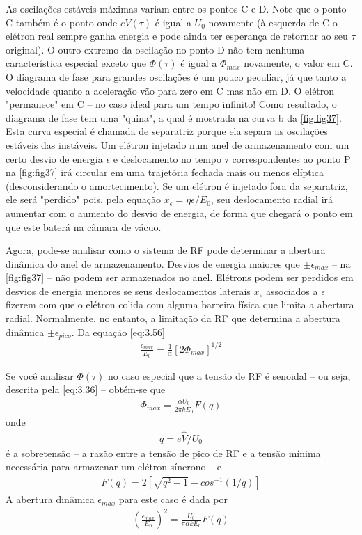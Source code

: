 As oscilações estáveis máximas variam entre os pontos C e D. Note que o ponto C também é o ponto onde $eV(\tau)$ é igual a $U_0$ novamente (à esquerda de C o elétron real sempre ganha energia e pode ainda ter esperança de retornar ao seu $\tau$ original). O outro extremo da oscilação no ponto D não tem nenhuma característica especial exceto que $\Phi(\tau)$ é igual a $\Phi_{max}$ novamente, o valor em C. O diagrama de fase para grandes oscilações é um pouco peculiar, já que tanto a velocidade quanto a aceleração vão para zero em C mas não em D. O elétron "permanece" em C -- no caso ideal para um tempo infinito! Como resultado, o diagrama de fase tem uma "quina", a qual é mostrada na curva b da \autoref{fig:fig37}. Esta curva especial é chamada de \uline{separatriz} porque ela separa as oscilações estáveis das instáveis. Um elétron injetado num anel de armazenamento com um certo desvio de energia $\epsilon$ e deslocamento no tempo $\tau$ correspondentes ao ponto P na \autoref{fig:fig37} irá circular em uma trajetória fechada mais ou menos elíptica (desconsiderando o amortecimento). Se um elétron é injetado fora da separatriz, ele será "perdido" pois, pela equação $x_\epsilon = \eta \epsilon/E_0$, seu deslocamento radial irá aumentar com o aumento do desvio de energia, de forma que chegará o ponto em que este baterá na câmara de vácuo.

Agora, pode-se analisar como o sistema de RF pode determinar a abertura dinâmica do anel de armazenamento. Desvios de energia maiores que $\pm \epsilon_{max}$ -- na \autoref{fig:fig37} -- não podem ser armazenados no anel. Elétrons podem ser perdidos em desvios de energia menores se seus deslocamentos laterais $x_\epsilon$ associados a $\epsilon$ fizerem com que o elétron colida com alguma barreira física que limita a abertura radial. Normalmente, no entanto, a limitação da RF que determina a abertura dinâmica $\pm \epsilon_{pico}$. Da equação \eqref{eq:3.56}
\begin{align}
	\frac{\epsilon_{max}}{E_0} = \frac{1}{\alpha}[2\Phi_{max}]^{1/2}\label{eq:3.57}
\end{align}

Se você analisar $\Phi(\tau)$ no caso especial que a tensão de RF é senoidal -- ou seja, descrita pela \eqref{eq:3.36} -- obtém-se que
\begin{align}
	\Phi_{max} = \frac{\alpha U_0}{2\pi k E_0} F(q)\label{eq:3.58}
\end{align}
onde
\begin{align}
	q = e\widehat{V}/U_0
\end{align}
é a sobretensão -- a razão entre a tensão de pico de RF e a tensão mínima necessária para armazenar um elétron síncrono -- e
\begin{align}
	F(q) = 2\left[\sqrt{q^2 - 1} - cos^{-1}(1/q)\right]\label{eq:3.60}
\end{align}
A abertura dinâmica $\epsilon_{max}$ para este caso é dada por
\begin{align}
	\left(\frac{\epsilon_{max}}{E_0}\right)^2 = \frac{U_0}{\pi \alpha k E_0} F(q)
\end{align}

